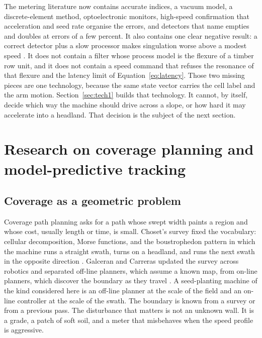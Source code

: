 The metering literature now contains accurate indices, a vacuum model, a discrete-element method, optoelectronic monitors, high-speed confirmation that acceleration and seed rate organise the errors, and detectors that name empties and doubles at errors of a few percent. It also contains one clear negative result: a correct detector plus a slow processor makes singulation worse above a modest speed \cite{borja2021}. It does not contain a filter whose process model is the flexure of a timber row unit, and it does not contain a speed command that refuses the resonance of that flexure and the latency limit of Equation~\eqref{eq:latency}. Those two missing pieces are one technology, because the same state vector carries the cell label and the arm motion. Section~\ref{sec:tech1} builds that technology. It cannot, by itself, decide which way the machine should drive across a slope, or how hard it may accelerate into a headland. That decision is the subject of the next section.

\section{Research on coverage planning and model-predictive tracking}
\label{sec:prev-plan}

\subsection{Coverage as a geometric problem}

Coverage path planning asks for a path whose swept width paints a region and whose cost, usually length or time, is small. Choset's survey fixed the vocabulary: cellular decomposition, Morse functions, and the boustrophedon pattern in which the machine runs a straight swath, turns on a headland, and runs the next swath in the opposite direction \cite{choset2001}. Galceran and Carreras updated the survey across robotics and separated off-line planners, which assume a known map, from on-line planners, which discover the boundary as they travel \cite{galceran2013}. A seed-planting machine of the kind considered here is an off-line planner at the scale of the field and an on-line controller at the scale of the swath. The boundary is known from a survey or from a previous pass. The disturbance that matters is not an unknown wall. It is a grade, a patch of soft soil, and a meter that misbehaves when the speed profile is aggressive.

